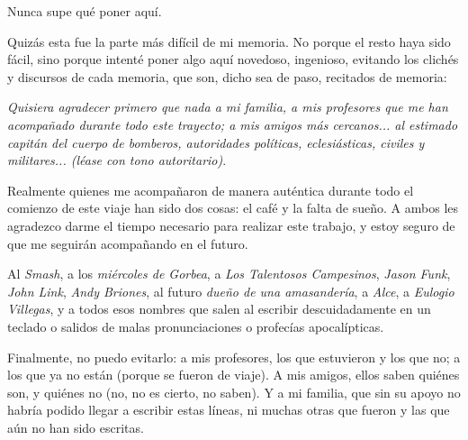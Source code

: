 \documentclass[upright, contnum]{umemoria}
\begin{document}
\begin{dedicatoria}
Nunca supe qué poner aquí.
\end{dedicatoria}

\begin{thanks}
Quizás esta fue la parte más difícil de mi memoria. No porque el resto haya sido fácil, sino porque
intenté poner algo aquí novedoso, ingenioso, evitando los clichés y discursos de cada memoria, que son, dicho sea de paso, recitados de memoria:

\textit{Quisiera agradecer primero que nada a mi familia, a mis profesores que me han acompañado durante todo este trayecto; a mis amigos más cercanos... al estimado capitán del cuerpo de bomberos, autoridades políticas, eclesiásticas, civiles y militares... (léase con tono autoritario)}.

Realmente quienes me acompañaron de manera auténtica durante todo el comienzo de este viaje han sido dos cosas: el café y la falta de sueño. A ambos les agradezco darme el tiempo necesario para realizar este trabajo, y estoy seguro de que me seguirán acompañando en el futuro.

Al \emph{Smash}, a los \emph{miércoles de Gorbea}, a \emph{Los Talentosos Campesinos}, \emph{Jason Funk}, \emph{John Link}, \emph{Andy Briones}, al futuro \emph{dueño de una amasandería}, a \emph{Alce}, a \emph{Eulogio Villegas}, y a todos esos nombres que salen al escribir descuidadamente en un teclado o salidos de malas pronunciaciones o profecías apocalípticas.

Finalmente, no puedo evitarlo: a mis profesores, los que estuvieron y los que no; a los que ya no están (porque se fueron de viaje). A mis amigos, ellos saben quiénes son, y quiénes no (no, no es cierto, no saben). Y a mi familia, que sin su apoyo no habría podido llegar a escribir estas líneas, ni muchas otras que fueron y las que aún no han sido escritas.

\end{thanks}

\cleardoublepage
\begin{spacing}{1}

	\tableofcontents
	\listoffigures

\end{spacing}

\setlength{\parskip}{\baselineskip}

\mainmatter







\nocite{*}



%
\end{document}
